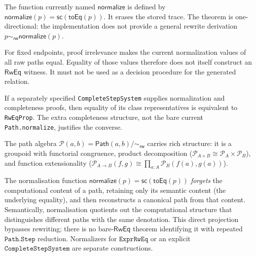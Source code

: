 \documentclass[manuscript]{BSLstyle}
\newcommand{\Path}{\mathsf{Path}}
\newcommand{\RwEq}{\mathsf{RwEq}}
\newcommand{\rweq}{\sim_{\mathsf{rw}}}
\begin{document}
The function currently named \(\mathsf{normalize}\) is defined by
\(\mathsf{normalize}(p)=\mathsf{sc}(\mathsf{toEq}(p))\).  It erases the stored
trace.  The theorem is one-directional: the implementation does not provide a
general rewrite derivation \(p\rweq\mathsf{normalize}(p)\).

\begin{remark}\label{cor:decidable}
For fixed endpoints, proof irrelevance makes the current normalization values
of all raw paths equal.  Equality of those values therefore does not itself
construct an \(\RwEq\) witness.  It must not be used as a decision procedure
for the generated relation.
\end{remark}

\begin{corollary}\label{cor:completeness}
If a separately specified \texttt{CompleteStepSystem} supplies normalization
and completeness proofs, then equality of its class representatives is
equivalent to \texttt{RwEqProp}.  The extra completeness structure, not the
bare current \texttt{Path.normalize}, justifies the converse.
\end{corollary}

\begin{remark}
The path algebra $\mathcal{P}(a, b) = \Path(a, b)/{\rweq}$ carries
rich structure: it is a groupoid with functorial congruence, product
decomposition ($\mathcal{P}_{A \times B} \cong \mathcal{P}_A \times \mathcal{P}_B$),
and function extensionality
($\mathcal{P}_{A \to B}(f, g) \cong \prod_{a:A} \mathcal{P}_B(f(a), g(a))$).
\end{remark}

\begin{remark}
The normalisation function $\mathsf{normalize}(p) = \mathsf{sc}(\mathsf{toEq}(p))$
\emph{forgets} the computational content of a path, retaining only
its semantic content (the underlying equality), and then reconstructs
a canonical path from that content.  Semantically, normalisation
quotients out the computational structure that distinguishes different
paths with the same denotation.  This direct projection bypasses rewriting;
there is no bare-\(\RwEq\) theorem identifying it with repeated
\(\texttt{Path.Step}\) reduction.  Normalizers for
\(\texttt{ExprRwEq}\) or an explicit \(\texttt{CompleteStepSystem}\) are
separate constructions.
\end{remark}
\end{document}

